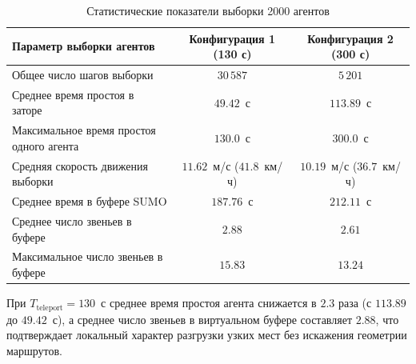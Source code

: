 \begin{table}[htbp]
\centering
\caption{Статистические показатели выборки 2000 агентов}
\label{tab:agent_sample_stats}
\small
\begin{tabularx}{\textwidth}{|L|c|c|}
\hline
\textbf{Параметр выборки агентов} & \textbf{Конфигурация 1 (130 с)} & \textbf{Конфигурация 2 (300 с)} \\ \hline
Общее число шагов выборки & $30\,587$ & $5\,201$ \\ \hline
Среднее время простоя в заторе & $49.42$~с & $113.89$~с \\ \hline
Максимальное время простоя одного агента & $130.0$~с & $300.0$~с \\ \hline
Средняя скорость движения выборки & $11.62$~м/с ($41.8$~км/ч) & $10.19$~м/с ($36.7$~км/ч) \\ \hline
Среднее время в буфере SUMO & $187.76$~с & $212.11$~с \\ \hline
Среднее число звеньев в буфере & $2.88$ & $2.61$ \\ \hline
Максимальное число звеньев в буфере & $15.83$ & $13.24$ \\ \hline
\end{tabularx}
\end{table}

При $T_{\text{teleport}} = 130$~с среднее время простоя агента снижается в $2.3$ раза (с $113.89$ до $49.42$~с), а среднее число звеньев в виртуальном буфере составляет $2.88$, что подтверждает локальный характер разгрузки узких мест без искажения геометрии маршрутов.
